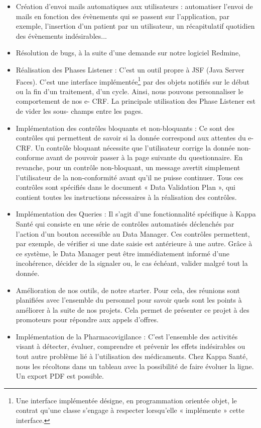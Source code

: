 \begin{itemize}
    \item Création d’envoi mails automatiques aux utilisateurs : automatiser l’envoi
    de mails en fonction des évènements qui se passent sur l’application, par
    exemple, l’insertion d’un
    patient par un utilisateur, un récapitulatif quotidien des évènements
    indésirables...
    \item Résolution de bugs, à la suite d’une demande sur notre logiciel Redmine,
    \item Réalisation des Phases Listener : C’est un outil propre à JSF (Java Server
    Faces). C’est une interface implémentée\footnote{Une interface implémentée désigne, en programmation orientée objet, le contrat qu’une classe s’engage à respecter lorsqu’elle « implémente » cette interface.} par des objets notifiés sur le début
    ou la fin d’un traitement,
    d’un cycle. Ainsi, nous pouvons personnaliser le comportement de nos e-
    CRF. La principale utilisation des Phase Listener est de vider les sous-
    champs entre les pages.
    \item Implémentation des contrôles bloquants et non-bloquants : Ce sont des
    contrôles qui permettent de savoir si la donnée correspond aux attentes du
    e-CRF. Un contrôle bloquant nécessite que l’utilisateur corrige la donnée non-conforme avant
    de pouvoir passer à la page suivante du questionnaire. En revanche, pour
    un contrôle non-bloquant, un message avertit simplement l’utilisateur de la
    non-conformité avant qu’il ne puisse continuer. Tous ces contrôles sont spécifiés dans le document « Data Validation Plan », qui contient toutes les
    instructions nécessaires à la réalisation des contrôles.
    \item Implémentation des Queries : Il s’agit d’une fonctionnalité spécifique à Kappa Santé qui consiste en une série de contrôles automatisés déclenchés par l’action d’un bouton accessible au Data Manager. Ces contrôles permettent, par exemple, de vérifier si une date saisie est antérieure à une autre. Grâce à ce système, le Data Manager peut être immédiatement informé d’une incohérence, décider de la signaler ou, le cas échéant, valider malgré tout la donnée.
    \item Amélioration de nos outils, de notre starter. Pour cela, des réunions sont planifiées avec l'ensemble du personnel pour savoir quels sont les points à améliorer à la suite de nos projets. Cela permet de présenter ce projet à des promoteurs pour répondre aux appels d'offres.
    \item Implémentation de la Pharmacovigilance : C'est l’ensemble des activités visant à détecter, évaluer, comprendre et prévenir les effets indésirables ou tout autre problème lié à l’utilisation des médicaments. Chez Kappa Santé, nous les récoltons dans un tableau avec la possibilité de faire évoluer la ligne. Un export PDF est possible.
\end{itemize}
